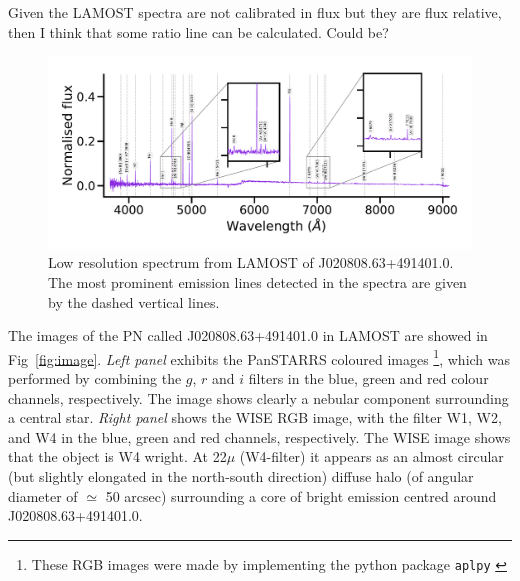 \documentclass[fleqn,usenatbib]{mnras}
\begin{document}
Given the LAMOST spectra are not calibrated in flux but they are flux relative,
then I think that some ratio line can be calculated. Could be?

\begin{figure}
\centering
  \includegraphics[width=\linewidth]{Figs/spec-56581-VB031N50V1_sp08-218.pdf}
  \caption{Low resolution spectrum from LAMOST of J020808.63+491401.0.
    The most prominent emission lines detected in the spectra are given by the dashed vertical
    lines.} 
  \label{fig:spectra}
\end{figure}

The images of the PN called J020808.63+491401.0 in LAMOST are showed
in Fig~\ref{fig:image}.
\textit{Left panel} exhibits the PanSTARRS coloured
images \footnote{These RGB images were made by implementing
the python package \texttt{aplpy} \citep{aplpy:2019}}, which
was performed by combining the $g$, $r$ and $i$ filters in
the blue, green and red colour channels, respectively.
The image shows clearly a nebular component surrounding 
a central star. \textit{Right panel} shows the
WISE RGB image, with the filter W1, W2, and W4 in
the blue, green and red channels, respectively.
 The WISE image shows that the object is W4 wright.  
At 22$\mu$ (W4-filter) it appears as an almost
circular (but slightly elongated in the north-south direction)
diffuse halo (of angular diameter of $\simeq$ 50 arcsec) surrounding
a core of bright emission centred around J020808.63+491401.0. 
\end{document}
